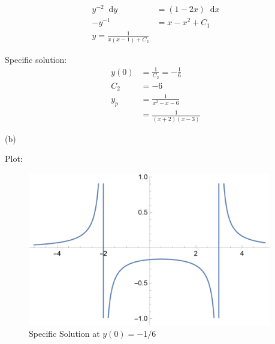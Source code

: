 \documentclass{article}
\newcommand{\dif}{\mathop{}\!\mathrm{d}}
\begin{document}
\begin{equation}
    \begin{aligned}
        y^{-2}\dif y&=(1-2x)\dif x\\
        -y^{-1}&=x-x^{2}+C_{1}\\
        y=\frac{1}{x(x-1)+C_{2}}
    \end{aligned}
\end{equation}

Specific solution:
\begin{equation}
    \begin{aligned}
        y(0)&=\frac{1}{C_{2}}=-\frac{1}{6}\\
        C_{2}&=-6\\
        y_{p}&=\frac{1}{x^2-x-6}\\
        &=\frac{1}{(x+2)(x-3)}
    \end{aligned}
\end{equation}

(b)

Plot:
\begin{figure}
    \begin{small}
        \begin{center}
            \includegraphics[width=0.95\textwidth]{figures/prob229.png}
        \end{center}
        \caption{Specific Solution at \( y(0)=-1/6 \) }
        \label{fig:sol_spec_229}
    \end{small}
\end{figure}
\end{document}
